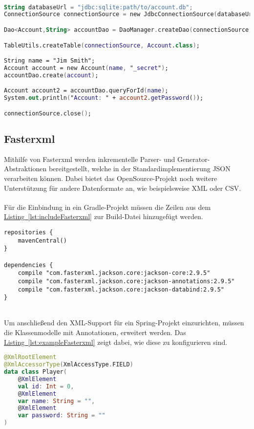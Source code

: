 \\
\begin{lstlisting}[style=lstStyleFramed, language=Kotlin, caption={Beispiel: Verwendung von ORMLite (verändert nach \cite{ormlite})}, label=lst:ormliteUsageExample, float]
String databaseUrl = "jdbc:sqlite:path/to/account.db";
ConnectionSource connectionSource = new JdbcConnectionSource(databaseUrl);

Dao<Account,String> accountDao = DaoManager.createDao(connectionSource, Account.class);

TableUtils.createTable(connectionSource, Account.class);

String name = "Jim Smith";
Account account = new Account(name, "_secret");
accountDao.create(account);

Account account2 = accountDao.queryForId(name);
System.out.println("Account: " + account2.getPassword());

connectionSource.close();
\end{lstlisting}

\subsection{Fasterxml}\label{sec:bibfasterxml}
Mithilfe von Fasterxml werden inkrementelle Parser- und Generator-Abstraktionen bereitgestellt, welche in der Standardimplementierung \gls{JSON} verarbeiten können. Dabei bietet das OpenSource-Projekt noch weitere Unterstützung für andere Datenformate an, wie beispielsweise \gls{XML} oder \gls{CSV}.\cite{fasterxml}\\
\\
Für die Einbindung in ein Gradle-Projekt müssen die Zeilen aus dem \hyperref[lst:includeFasterxml]{Listing~\ref{lst:includeFasterxml}} zur Build-Datei hinzugefügt werden.
\\
\begin{lstlisting}[style=lstStyleFramed, language=Gradle, caption={Einbindung der Bibliothek Fasterxml mittels Gradle}, label=lst:includeFasterxml, float]
repositories {
	mavenCentral()
}

dependencies {
	compile "com.fasterxml.jackson.core:jackson-core:2.9.5"
	compile "com.fasterxml.jackson.core:jackson-annotations:2.9.5"
	compile "com.fasterxml.jackson.core:jackson-databind:2.9.5"
}
\end{lstlisting}
\\
Um anschließend den \gls{XML}-Support für ein Spring-Projekt einzurichten, müssen die Klassenmodelle mit Annotationen, erweitert werden. Das \hyperref[lst:exampleFasterxml]{Listing~\ref{lst:exampleFasterxml}} zeigt dabei, wie diese zu konfigurieren sind.
\\
\begin{lstlisting}[style=lstStyleFramed, language=Kotlin, caption={Beispiel: Verwendung von Fasterxml}, label=lst:exampleFasterxml, float]
@XmlRootElement
@XmlAccessorType(XmlAccessType.FIELD)
data class Player(
	@XmlElement
	val id: Int = 0,
	@XmlElement
	var name: String = "",
	@XmlElement
	var password: String = ""
)
\end{lstlisting} 

